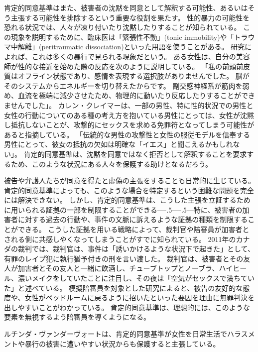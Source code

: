 \documentclass[paper=a4,book,openany]{jlreq}
\newcommand{\ig}[1]{}           %
\def\DDASH{―\kern-.5\zw―\kern-.5\zw―} %
\begin{document}
肯定的同意基準はまた、被害者の沈黙を同意として解釈する可能性、あるいはそう主張する可能性を排除するという重要な役割を果たす。
性的暴力の可能性を恐れる状況では、人々が凍り付いたり沈黙したりすることが知られている。
この現象を説明するために、臨床医は「緊張性不動」(tonic immobility)や「トラウマ中解離」(peritraumatic dissociation)といった用語を使うことがある。
研究によれば、これは多くの暴行で見られる現象だという\citep{moller17:_tonic_immob_durin_sexual_assaul}。
ある女性は、自分の美容師が性的な接近を始めた際の反応を次のように説明している。
「私の前頭前皮質はオフライン状態であり、感情を表現する選択肢がありませんでした。
脳がそのシステムからエネルギーを切り替えたからです。
副交感神経系が筋肉を弱め、血流を極端に減少させたため、物理的に動いたり反応したりすることができませんでした」\citep{corvo18:_why_i_froze_smiled_durin}。
カレン・クレイマー\ig{Karen Kramer}は、一部の男性、特に性的状況での男性と女性の行動についてのある種の考え方を抱いている男性にとっては、女性が沈黙し抵抗しないことが、攻撃的にセックスを求める免罪符となってしまう可能性があると指摘している。
「伝統的な男性の攻撃性と女性の服従モデルを信奉する男性にとって、彼女の抵抗の欠如は明確な「イエス」と聞こえるかもしれない」\citep[p.121]{kramer94:_rule_myth}。
肯定的同意基準は、沈黙を同意ではなく拒否として解釈することを要求するため、このような状況にある人々を保護する助けとなるだろう。

被告や弁護人たちが同意を得たと虚偽の主張をすることも日常的に生じている。
肯定的同意基準によっても、このような場合を特定するという困難な問題を完全には解決できない。
しかし、肯定的同意基準は、こうした主張を立証するために用いられる証拠の一部を制限することができる{\DDASH}特に、被害者の加害者に対する過去の行動や、事件の文脈に訴えるような証拠の種類を制限することができる。
こうした証拠を用いる戦略によって、裁判官や陪審員が加害者とされる側に共感しやくなってしまうことがすでに知られている。
2011年のカナダの裁判では、裁判官は、事件は「誘いかけるような状況下で起きた」として、有罪のレイプ犯に執行猶予付きの刑を言い渡した。
裁判官は、被害者とその友人が加害者とその友人と一緒に飲酒し、チューブトップとノーブラ、ハイヒール、濃いメイクをしていたことに注目し、その夜は「空気がセックスで満ちていた」と述べている\citep{cbc11:_manit_judge_rebuk_sex_assaul_remar}。
模擬陪審員を対象とした研究によると、被告の友好的な態度や、女性がベッドルームに戻るように招いたといった要因を理由に無罪判決を出しやすいことがわかっている\citep{finch06:_break_bound}。
肯定的同意基準は、理想的には、このような要素を無視するよう陪審員を導くようになる。

ルチンダ・ヴァンダーヴォート\ig{Lucinda Vandervort}は、肯定的同意基準が女性を日常生活でハラスメントや暴行の被害に遭いやすい状況からも保護すると主張している。
\end{document}
